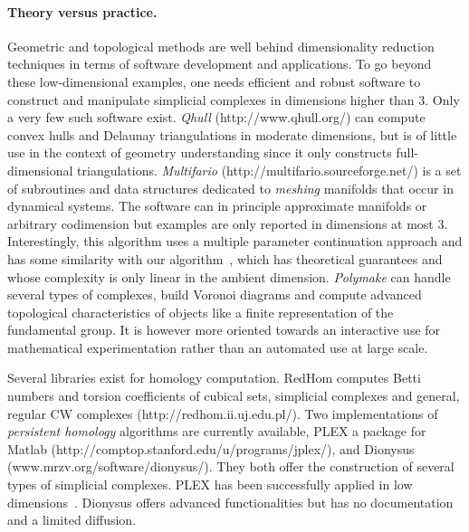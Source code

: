 \paragraph{Theory versus practice.} 
Geometric and topological methods are well behind dimensionality reduction techniques in terms of 
software development and applications.  
%
%
To go beyond these low-dimensional examples, one needs efficient and robust software to construct and manipulate simplicial complexes in dimensions higher than 3.  Only a very few such software exist.  {\em Qhull} (http://www.qhull.org/) can compute convex hulls and Delaunay triangulations in moderate dimensions, but is of little use in the context of geometry understanding since it only constructs full-dimensional triangulations. {\em Multifario} (http://multifario.sourceforge.net/) is a set of subroutines and data structures dedicated to {\em meshing} manifolds that occur in dynamical systems. The software can in principle approximate manifolds or arbitrary codimension but examples are only reported in dimensions at most 3. Interestingly, this algorithm  uses a multiple parameter continuation approach and has some similarity with our algorithm~\cite{boissonnat2010meshing}, which has theoretical guarantees and whose complexity is only linear in the ambient dimension.  {\em Polymake} can handle several types of complexes, build Voronoi diagrams and compute advanced topological characteristics of objects like a finite representation of the fundamental group. It is however more oriented towards an interactive use for mathematical experimentation
rather than  an automated use at large scale.%

Several libraries exist for homology computation. RedHom computes Betti numbers and torsion coefficients of cubical sets, simplicial complexes and general, regular CW complexes (http://redhom.ii.uj.edu.pl/).
Two implementations of {\em persistent homology} algorithms are currently available, PLEX a package for Matlab (http://comptop.stanford.edu/u/programs/jplex/), and  Dionysus (www.mrzv.org/software/dionysus/). They both offer the construction of several types of simplicial complexes. PLEX has been  successfully applied in low dimensions~\cite{fpgo-airc-2009,rg-bptd-2008,mtcw-tco-2010}. Dionysus offers advanced
functionalities but has no documentation and a limited diffusion.
\vspace{2mm}

